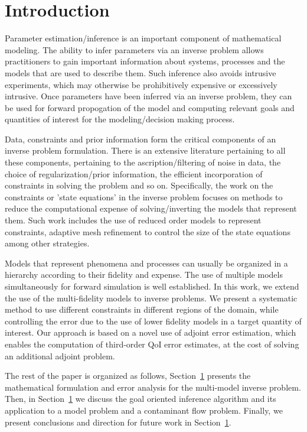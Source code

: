 \section{Introduction}

Parameter estimation/inference is an important component of mathematical modeling. The ability to infer parameters via an inverse problem allows practitioners to gain important information about systems, processes and the models that are used to describe them. Such inference also avoids intrusive experiments, which may otherwise be prohibitively expensive or excessively intrusive. Once parameters have been inferred via an inverse problem, they can be used for forward propogation of the model and computing relevant goals and quantities of interest for the modeling/decision making process.

Data, constraints and prior information form the critical components of an inverse problem formulation. There is an extensive literature pertaining to all these components, pertaining to the ascription/filtering of noise in data, the choice of regularization/prior information, the efficient incorporation of constraints in solving the problem and so on. Specifically, the work on the constraints or 'state equations' in the inverse problem focuses on methods to reduce the computational expense of solving/inverting the models that represent them. Such work includes the use of reduced order models to represent constraints, adaptive mesh refinement to control the size of the state equations among other strategies.

Models that represent phenomena and processes can usually be organized in a hierarchy according to their fidelity and expense. The use of multiple models simultaneously for forward simulation is well established. In this work, we extend the use of the multi-fidelity models to inverse problems. We present a systematic method to use different constraints in different regions of the domain, while controlling the error due to the use of lower fidelity models in a target quantity of interest. Our approach is based on a novel use of adjoint error estimation, which enables the computation of third-order QoI error estimates, at the cost of solving an additional adjoint problem. 

The rest of the paper is organized as follows, Section~\ref{} presents the mathematical formulation and error analysis for the multi-model inverse problem. Then, in Section~\ref{} we discuss the goal oriented inference algorithm and its application to a model problem and a contaminant flow problem. Finally, we present conclusions and direction for future work in Section~\ref{}.

